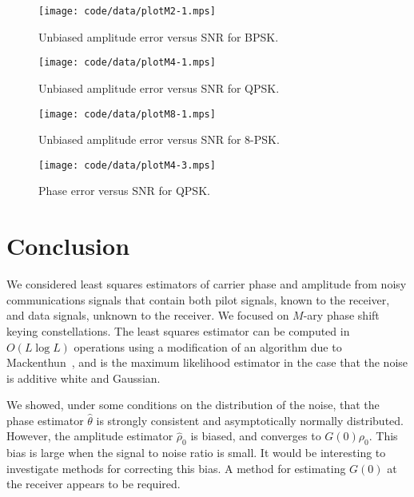 \documentclass[journal]{IEEEtran}
\begin{document}
\begin{figure}[p]
	\centering
		\texttt{[image: code/data/plotM2-1.mps]}
		\caption{Unbiased amplitude error versus SNR for BPSK.}
		\label{fig:plotampBPSK}
\end{figure}

\begin{figure}[p]
	\centering
		\texttt{[image: code/data/plotM4-1.mps]}
		\caption{Unbiased amplitude error versus SNR for QPSK.}
		\label{fig:plotampQPSK}
\end{figure}

\begin{figure}[p]
	\centering
		\texttt{[image: code/data/plotM8-1.mps]}
		\caption{Unbiased amplitude error versus SNR for $8$-PSK.}
		\label{fig:plotamp8PSK}
\end{figure}


\begin{figure}[tp]
	\centering
		\texttt{[image: code/data/plotM4-3.mps]}
		\caption{Phase error versus SNR for QPSK.}
		\label{fig:plotphaseQPSKmultL}
\end{figure}


\section{Conclusion}

We considered least squares estimators of carrier phase and amplitude from noisy communications signals that contain both pilot signals, known to the receiver, and data signals, unknown to the receiver.  We focused on $M$-ary phase shift keying constellations.  The least squares estimator can be computed in $O(L\log L)$ operations using a modification of an algorithm due to Mackenthun~\cite{Mackenthun1994}, and is the maximum likelihood estimator in the case that the noise is additive white and Gaussian.  

We showed, under some conditions on the distribution of the noise, that the phase estimator $\hat{\theta}$ is strongly consistent and asymptotically normally distributed.  However, the amplitude estimator $\hat{\rho}_0$ is biased, and converges to $G(0)\rho_0$.  This bias is large when the signal to noise ratio is small.  It would be interesting to investigate methods for correcting this bias.  A method for estimating $G(0)$ at the receiver appears to be required.
\end{document}

